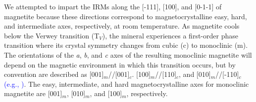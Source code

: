 \documentclass[draft,gc]{AGUTeX}
\begin{document}
\begin{article}
We attempted to impart the IRMs along the [-111], [100], and [0-1-1] of magnetite because these directions correspond to magnetocrystalline easy, hard, and intermediate axes, respectively, at room temperature. As magnetite cools below the Verwey transition (T$_{V}$), the mineral experiences a first-order phase transition where its crystal symmetry changes from cubic (c) to monoclinic (m). The orientations of the \textit{a}, \textit{b}, and \textit{c} axes of the resulting monoclinic magnetite will depend on the magnetic environment in which this transition occurs, but by convention are described as [001]$_{m}$//[001]$_{c}$. [100]$_{m}$//[110]$_{c}$, and [010]$_{m}$//[-110]$_{c}$ \textcolor{blue}{(e.g., \cite{Kasama2010a})}. The easy, intermediate, and hard magnetocrystalline axes for monoclinic magnetite are [001]$_{m}$, [010]$_{m}$, and [100]$_{m}$, respectively. 


\end{article}
\end{document}
